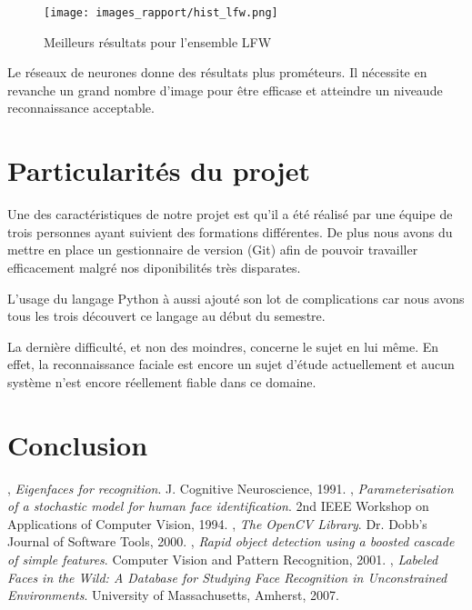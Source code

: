 \documentclass[a4paper,10pt,twocolumn]{extarticle}
\begin{document}
\begin{figure}[H]
  \begin{center}
    \texttt{[image: images\_rapport/hist\_lfw.png]}
    \caption{Meilleurs résultats pour l'ensemble LFW}
    \label{fig:results_lfw}
  \end{center}
\end{figure}
Le réseaux de neurones donne des résultats plus prométeurs. Il nécessite en revanche un grand nombre d'image pour être efficase et atteindre un niveaude reconnaissance acceptable.

\section{Particularités du projet}
Une des caractéristiques de notre projet est qu'il a été réalisé par une équipe de trois personnes ayant suivient des formations différentes. De plus nous avons du mettre en place un gestionnaire de version (Git) afin de pouvoir travailler efficacement malgré nos diponibilités très disparates.

L'usage du langage Python à aussi ajouté son lot de complications car nous avons tous les trois découvert ce langage au début du semestre.

La dernière difficulté, et non des moindres, concerne le sujet en lui même. En effet, la reconnaissance faciale est encore un sujet d'étude actuellement et aucun système n'est encore réellement fiable dans ce domaine.

\section{Conclusion}


\begin{thebibliography}{9}
  , 
  \emph{Eigenfaces for recognition}.
  J. Cognitive Neuroscience,
  1991. 
  , 
  \emph{Parameterisation of a stochastic model for human face identification}.
  2nd IEEE Workshop on Applications of Computer Vision,
  1994.
  , 
  \emph{The OpenCV Library}.
  Dr. Dobb's Journal of Software Tools,
  2000.
  , 
  \emph{Rapid object detection using a boosted cascade of simple features}.
  Computer Vision and Pattern Recognition,
  2001.
  , 
  \emph{Labeled Faces in the Wild: A Database for Studying Face Recognition in Unconstrained Environments}.
  University of Massachusetts, Amherst,
  2007.

\end{thebibliography}
\end{document}
